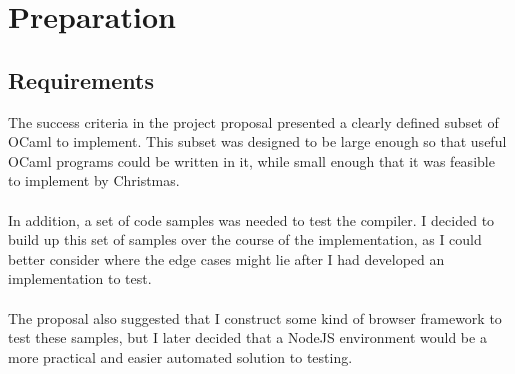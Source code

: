 \chapter{Preparation}


\section{Requirements}
The success criteria in the project proposal presented a clearly defined subset of OCaml to implement. This subset was designed to be large enough so that useful OCaml programs could be written in it, while small enough that it was feasible to implement by Christmas.
\\\\
In addition, a set of code samples was needed to test the compiler. I decided to build up this set of samples over the course of the implementation, as I could better consider where the edge cases might lie after I had developed an implementation to test.
\\\\
The proposal also suggested that I construct some kind of browser framework to test these samples, but I later decided that a NodeJS environment would be a more practical and easier automated solution to testing.




